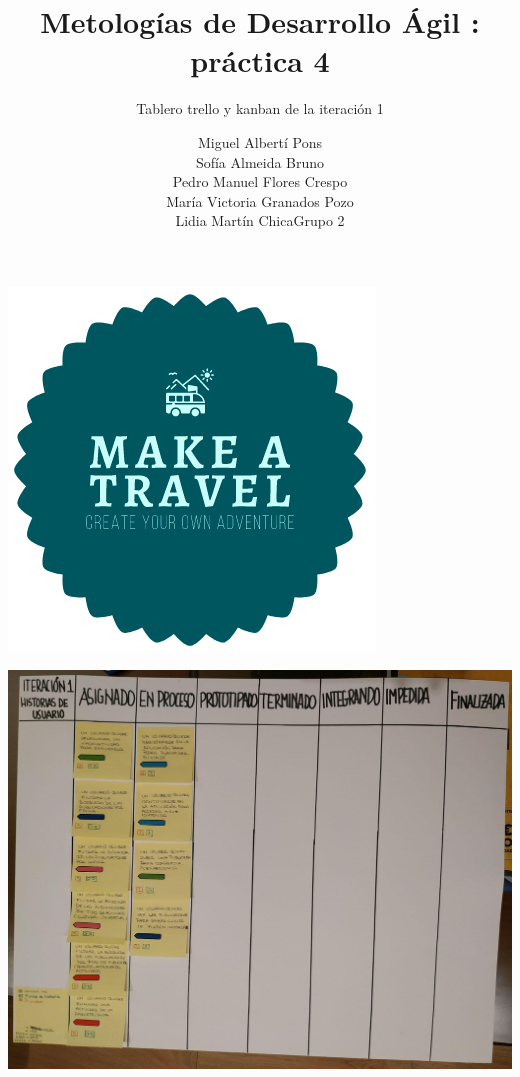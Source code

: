 \documentclass[spanish]{beamer}
\title{Metologías de Desarrollo Ágil : práctica 4}
\subtitle{Tablero trello y kanban de la iteración 1}
\author{Miguel Albertí Pons\\ Sofía Almeida Bruno\\ Pedro Manuel Flores Crespo\\ María Victoria Granados Pozo\\ Lidia Martín Chica\vspace{1em}Grupo 2}
\begin{document}
\maketitle

\begin{frame}
\centering
\begin{center}
		\includegraphics[scale=0.4]{../../Imagenes/Logo}
	\end{center}
\end{frame}


\begin{frame}
	\begin{center}
		\includegraphics[angle=90, scale=0.32]{papel1_1}
	\end{center}
\end{frame}
\end{document}
